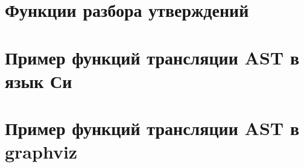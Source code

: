 \section*{Функции разбора утверждений}


% 


\section*{Пример функций трансляции AST в язык Си}


\section*{Пример функций трансляции AST в graphviz}




% 





